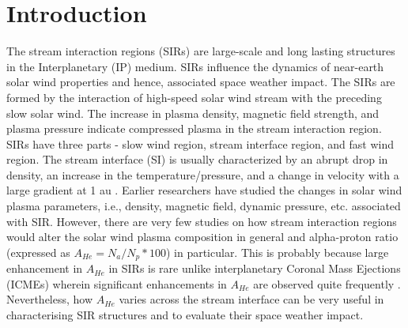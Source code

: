 \documentclass[letters,usenatbib]{mnras}
\begin{document}
\section{Introduction}
The stream interaction regions (SIRs) are large-scale and long lasting structures in the Interplanetary (IP) medium. SIRs influence the dynamics of near-earth solar wind properties and hence, associated space weather impact. The SIRs are formed by the interaction of high-speed solar wind stream with the preceding slow solar wind. The increase in plasma density, magnetic field strength, and plasma pressure indicate compressed plasma in the stream interaction region.  SIRs have three parts - slow wind region, stream interface region, and fast wind region. The stream interface (SI) is usually characterized by an abrupt drop in density, an increase in the temperature/pressure, and a change in velocity with a large gradient at 1 au \citep{Burlaga1974, Belcher1971}. Earlier researchers have studied the changes in solar wind plasma parameters, i.e., density, magnetic field, dynamic pressure, etc. \citep[][and references therein]{Richardson2018}  associated with SIR.  However, there are very few studies \citep[e.g.][]{Gosling1978, Durovcova2019} on how stream interaction regions would alter the solar wind plasma composition in general and alpha-proton ratio (expressed as $A_{He} = N_{a}/N_p*100$) in particular. This is probably because large enhancement in $A_{He}$ in SIRs is rare unlike interplanetary Coronal Mass Ejections (ICMEs) wherein significant enhancements in $A_{He}$ are observed quite frequently \citep[][etc.]{Richardson2010, Fu2020, Yogesh2022}. Nevertheless, how $A_{He}$ varies across the stream interface can be very useful in characterising SIR structures and to evaluate their space weather impact.    
\end{document}
